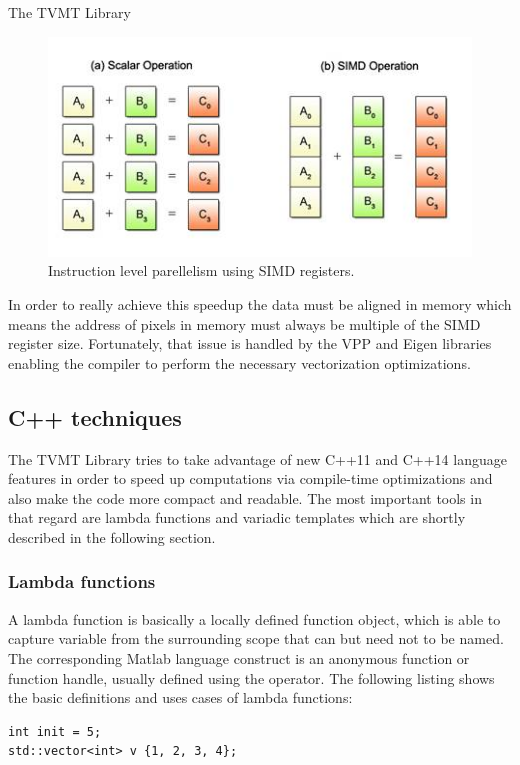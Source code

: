 \begin{chapter}{The TVMT Library}
\begin{figure}[h!]
        \centering
	    \includegraphics[width=0.7\linewidth]{./figures/library/simd.jpg}
	\caption[SIMD parallelization]{Instruction level parellelism using SIMD registers.
	}
	\label{fig:simd}
\end{figure}

In order to really achieve this speedup the data must be aligned in memory which means the address of pixels in memory must always be multiple of the SIMD register size. Fortunately,
that issue is handled by the VPP and Eigen libraries enabling the compiler to perform the necessary vectorization optimizations.



\subsection{C++ techniques} %
\label{sub:C++ techniques}
The TVMT Library tries to take advantage of new C++11 and C++14 language features in order to speed up computations via compile-time optimizations and also make the code
more compact and readable. The most important tools in that regard are lambda functions and variadic templates which are shortly described in the following section.

\subsubsection{Lambda functions} %
\label{ssub:Lambda functions}
A lambda function is basically a locally defined function object, which is able to capture variable from the surrounding scope that can but need not to be named.
The corresponding Matlab language construct is an anonymous function or function handle, usually defined using the \@ operator. The following listing
shows the basic definitions and uses cases of lambda functions:\\

\cppinline
\begin{lstlisting}[label=code:lambdafun,caption={Lambda functions}]
int init = 5;
std::vector<int> v {1, 2, 3, 4};


\end{lstlisting}
\end{chapter}
